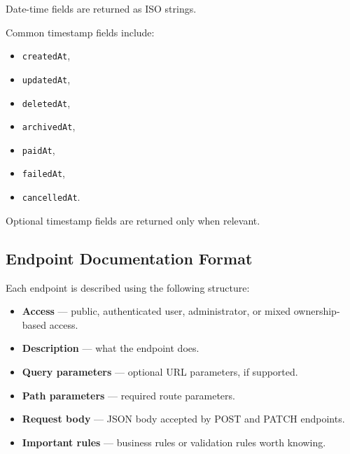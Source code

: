 Date-time fields are returned as ISO strings.

Common timestamp fields include:

\begin{itemize}
    \item \texttt{createdAt},
    \item \texttt{updatedAt},
    \item \texttt{deletedAt},
    \item \texttt{archivedAt},
    \item \texttt{paidAt},
    \item \texttt{failedAt},
    \item \texttt{cancelledAt}.
\end{itemize}

Optional timestamp fields are returned only when relevant.

\subsection{Endpoint Documentation Format}

Each endpoint is described using the following structure:

\begin{itemize}
    \item \textbf{Access} --- public, authenticated user, administrator, or mixed ownership-based access.
    \item \textbf{Description} --- what the endpoint does.
    \item \textbf{Query parameters} --- optional URL parameters, if supported.
    \item \textbf{Path parameters} --- required route parameters.
    \item \textbf{Request body} --- JSON body accepted by POST and PATCH endpoints.
    \item \textbf{Important rules} --- business rules or validation rules worth knowing.
\end{itemize}
